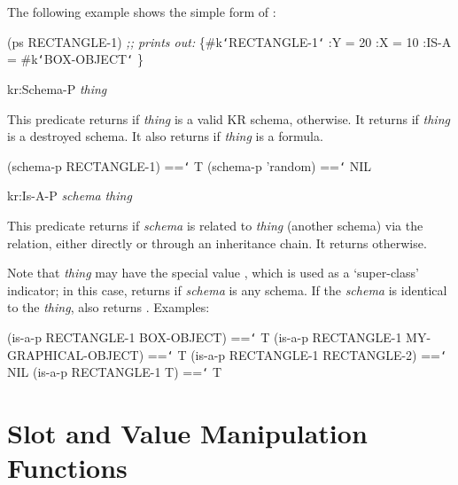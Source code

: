 The following example shows the simple form of :
\begin{programexample}
(ps RECTANGLE-1)
{\it ;; prints out:}
\{\#k{\tt\char`\<}RECTANGLE-1{\tt\char`\>}
  :Y =  20
  :X =  10
  :IS-A =  \#k{\tt\char`\<}BOX-OBJECT{\tt\char`\>}
  \}
\end{programexample}



\value{f-top}
\begin{example}
kr:Schema-P {\it thing}\value{function}
\end{example}

This predicate returns \value{t} if {\it thing} is a valid KR schema,
\value{nil} otherwise.  It returns \value{nil} if {\it thing} is a
destroyed schema.  It also returns \value{nil} if {\it thing} is a formula.

\begin{programexample}
(schema-p RECTANGLE-1) =={\tt\char`\>} T
(schema-p 'random) =={\tt\char`\>} NIL
\end{programexample}


\value{f-top}
\begin{example}
kr:Is-A-P {\it schema} {\it thing}\value{function}
\end{example}

This predicate returns \value{T} if {\it schema} is related to {\it thing}
(another schema) via the  relation, either directly or through an
inheritance chain.  It returns \value{nil} otherwise.

Note that {\it thing} may have the special value \value{T}, which is used as
a `super-class' indicator; in this case,  returns \value{T} if
{\it schema} is any schema.  If the {\it schema} is identical to the {\it thing},
 also returns \value{T}.\newline{} Examples:
\begin{programexample}
(is-a-p RECTANGLE-1 BOX-OBJECT) =={\tt\char`\>} T
(is-a-p RECTANGLE-1 MY-GRAPHICAL-OBJECT) =={\tt\char`\>} T
(is-a-p RECTANGLE-1 RECTANGLE-2) =={\tt\char`\>} NIL
(is-a-p RECTANGLE-1 T) =={\tt\char`\>} T
\end{programexample}



\section{Slot and Value Manipulation Functions}
\value{s-top}

